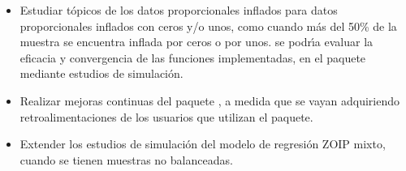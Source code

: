 \begin{itemize}
	\item Estudiar t\'{o}picos de los datos proporcionales inflados para datos proporcionales inflados con ceros y/o unos, como cuando m\'{a}s del 50\% de la muestra se encuentra inflada por ceros o por unos. se podr\'{\i}a evaluar la eficacia y convergencia de las funciones implementadas, en el paquete  mediante estudios de simulaci\'{o}n.
	\item Realizar mejoras continuas del paquete , a medida que se vayan adquiriendo retroalimentaciones de los usuarios que utilizan el paquete.
	\item Extender los estudios de simulaci\'{o}n del modelo de regresi\'{o}n ZOIP mixto, cuando se tienen muestras no balanceadas.

\end{itemize}


